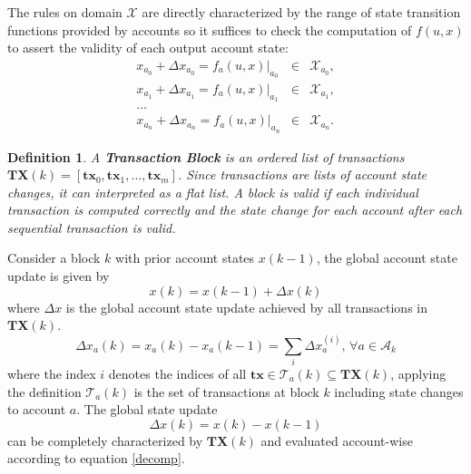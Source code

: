 \documentclass[letterpaper, 10 pt, conference]{ieeeconf}  %
\newtheorem{definition}{Definition}
\begin{document}
The rules on domain $\mathcal{X}$ are directly characterized by the range of state transition functions provided by accounts so it suffices to check the computation of $f(u, x)$ to assert the validity of each output account state: 
\begin{eqnarray*}
x_{a_0}+\Delta x_{a_0}=f_{a}(u, x)|_{a_0}&\in&\mathcal{X}_{a_0},\\
x_{a_1}+\Delta x_{a_1}=f_{a}(u, x)|_{a_1}&\in&\mathcal{X}_{a_1},\\
\ldots &&\\
x_{a_n}+\Delta x_{a_n}=f_{a}(u, x)|_{a_n}&\in&\mathcal{X}_{a_n}.
\end{eqnarray*}

\begin{definition} A \textbf{Transaction Block} is an ordered list of transactions $\mathbf{TX}(k) = [\mathbf{tx}_0, \mathbf{tx}_1, \ldots, \mathbf{tx}_m]$. Since transactions are lists of account state changes, it can interpreted as a flat list. A block is valid if each individual transaction is computed correctly and the state change for each account after each sequential transaction is valid. 
\label{transactionblock}
\end{definition} 

Consider a block $k$ with prior account states $x(k-1)$, the global account state update is given by
\begin{equation}
    x(k) = x(k-1) + \Delta x(k)
\end{equation}
where $\Delta x$ is the global account state update achieved by all transactions in $\mathbf{TX}(k)$.
\begin{equation}
    \Delta x_a(k) = x_a(k) - x_a(k-1)=\sum_{i}\Delta x^{(i)}_a, \, \forall a\in \mathcal{A}_k \label{decomp}
\end{equation}
where the index $i$ denotes the indices of all $\mathbf{tx}\in \mathcal{T}_a(k)\subseteq\mathbf{TX}(k)$, applying the definition $\mathcal{T}_a(k)$ is the set of transactions at block $k$ including state changes to account $a$. The global state update
\begin{equation}
    \Delta x(k) = x(k)- x(k-1) 
\end{equation}
can be completely characterized by $\mathbf{TX}(k)$ and evaluated account-wise according to equation \eqref{decomp}.
\end{document}
